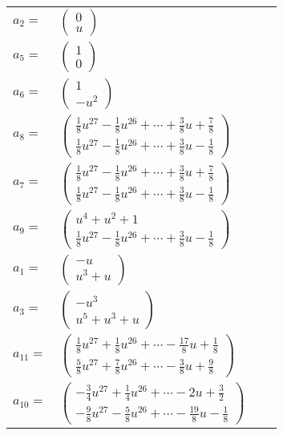 \documentclass[1p]{elsarticle_modified}
\theoremstyle{definition}
\begin{document}
\begin{tabular}{m{7pt} m{180pt} m{7pt} m{180pt} }
\flushright $a_{2}=$&$\begin{pmatrix}0\\u\end{pmatrix}$ \\
\flushright $a_{5}=$&$\begin{pmatrix}1\\0\end{pmatrix}$ \\
\flushright $a_{6}=$&$\begin{pmatrix}1\\- u^2\end{pmatrix}$ \\
\flushright $a_{8}=$&$\begin{pmatrix}\frac{1}{8} u^{27}-\frac{1}{8} u^{26}+\cdots+\frac{3}{8} u+\frac{7}{8}\\\frac{1}{8} u^{27}-\frac{1}{8} u^{26}+\cdots+\frac{3}{8} u-\frac{1}{8}\end{pmatrix}$ \\
\flushright $a_{7}=$&$\begin{pmatrix}\frac{1}{8} u^{27}-\frac{1}{8} u^{26}+\cdots+\frac{3}{8} u+\frac{7}{8}\\\frac{1}{8} u^{27}-\frac{1}{8} u^{26}+\cdots+\frac{3}{8} u-\frac{1}{8}\end{pmatrix}$ \\
\flushright $a_{9}=$&$\begin{pmatrix}u^4+u^2+1\\\frac{1}{8} u^{27}-\frac{1}{8} u^{26}+\cdots+\frac{3}{8} u-\frac{1}{8}\end{pmatrix}$ \\
\flushright $a_{1}=$&$\begin{pmatrix}- u\\u^3+u\end{pmatrix}$ \\
\flushright $a_{3}=$&$\begin{pmatrix}- u^3\\u^5+u^3+u\end{pmatrix}$ \\
\flushright $a_{11}=$&$\begin{pmatrix}\frac{1}{8} u^{27}+\frac{1}{8} u^{26}+\cdots-\frac{17}{8} u+\frac{1}{8}\\\frac{5}{8} u^{27}+\frac{7}{8} u^{26}+\cdots-\frac{3}{8} u+\frac{9}{8}\end{pmatrix}$ \\
\flushright $a_{10}=$&$\begin{pmatrix}-\frac{3}{4} u^{27}+\frac{1}{4} u^{26}+\cdots-2 u+\frac{3}{2}\\-\frac{9}{8} u^{27}-\frac{5}{8} u^{26}+\cdots-\frac{19}{8} u-\frac{1}{8}\end{pmatrix}$ \\

\end{tabular}
\end{document}
